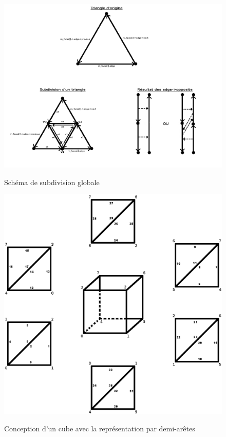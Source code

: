 \documentclass[a4paper]{memoir}
\begin{document}
			\begin{figure}
				\hspace{-3cm}\includegraphics[scale=0.5]{img/subdivide.png}
				\label{fig:subdivide}
				\caption{Schéma de subdivision globale}
			\end{figure}
			
			\begin{figure}
				\hspace{-4cm}\includegraphics[scale=0.5]{img/cube.png}
				\label{fig:cube}
				\caption{Conception d'un cube avec la représentation par demi-arêtes}
			\end{figure}
\end{document}
